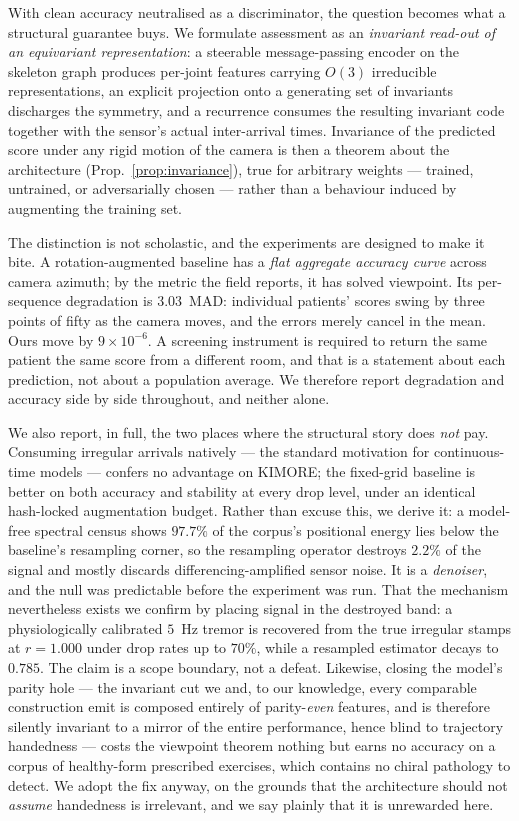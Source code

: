 \documentclass[10pt,journal]{IEEEtran}
\begin{document}
With clean accuracy neutralised as a discriminator, the question becomes what a structural guarantee buys. We formulate assessment as an \emph{invariant read-out of an equivariant representation}: a steerable message-passing encoder on the skeleton graph produces per-joint features carrying $O(3)$ irreducible representations, an explicit projection onto a generating set of invariants discharges the symmetry, and a recurrence consumes the resulting invariant code together with the sensor's actual inter-arrival times. Invariance of the predicted score under any rigid motion of the camera is then a theorem about the architecture (Prop.~\ref{prop:invariance}), true for arbitrary weights --- trained, untrained, or adversarially chosen --- rather than a behaviour induced by augmenting the training set.

The distinction is not scholastic, and the experiments are designed to make it bite. A rotation-augmented baseline has a \emph{flat aggregate accuracy curve} across camera azimuth; by the metric the field reports, it has solved viewpoint. Its per-sequence degradation is $3.03$~MAD: individual patients' scores swing by three points of fifty as the camera moves, and the errors merely cancel in the mean. Ours move by $9\times10^{-6}$. A screening instrument is required to return the same patient the same score from a different room, and that is a statement about each prediction, not about a population average. We therefore report degradation and accuracy side by side throughout, and neither alone.

We also report, in full, the two places where the structural story does \emph{not} pay. Consuming irregular arrivals natively --- the standard motivation for continuous-time models --- confers no advantage on KIMORE; the fixed-grid baseline is better on both accuracy and stability at every drop level, under an identical hash-locked augmentation budget. Rather than excuse this, we derive it: a model-free spectral census shows $97.7\%$ of the corpus's positional energy lies below the baseline's resampling corner, so the resampling operator destroys $2.2\%$ of the signal and mostly discards differencing-amplified sensor noise. It is a \emph{denoiser}, and the null was predictable before the experiment was run. That the mechanism nevertheless exists we confirm by placing signal in the destroyed band: a physiologically calibrated $5$~Hz tremor is recovered from the true irregular stamps at $r=1.000$ under drop rates up to $70\%$, while a resampled estimator decays to $0.785$. The claim is a scope boundary, not a defeat. Likewise, closing the model's parity hole --- the invariant cut we and, to our knowledge, every comparable construction emit is composed entirely of parity-\emph{even} features, and is therefore silently invariant to a mirror of the entire performance, hence blind to trajectory handedness --- costs the viewpoint theorem nothing but earns no accuracy on a corpus of healthy-form prescribed exercises, which contains no chiral pathology to detect. We adopt the fix anyway, on the grounds that the architecture should not \emph{assume} handedness is irrelevant, and we say plainly that it is unrewarded here.
\end{document}
